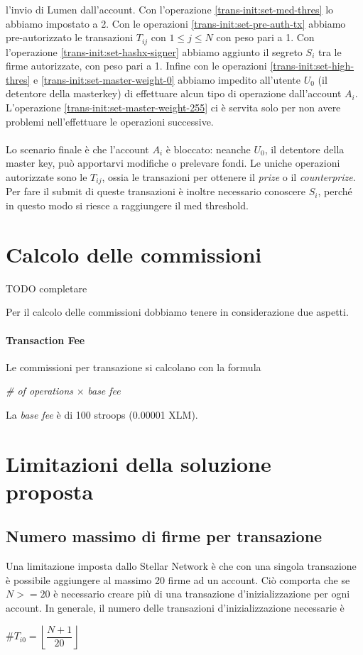 l'invio di Lumen dall'account.
Con l'operazione \ref{trans-init:set-med-thres} lo abbiamo impostato a 2.
Con le operazioni \ref{trans-init:set-pre-auth-tx} abbiamo pre-autorizzato
le transazioni
$ T_{ij} $ con $ 1 \leq j \leq N $ con peso pari a 1.
Con l'operazione \ref{trans-init:set-hashx-signer} abbiamo aggiunto il segreto
$ S_i $ tra le firme autorizzate, con peso pari a 1.
Infine con le operazioni \ref{trans-init:set-high-thres} e
\ref{trans-init:set-master-weight-0} abbiamo impedito all'utente $ U_0 $ (il
detentore della masterkey) di effettuare alcun tipo di operazione dall'account $ A_i $.
L'operazione \ref{trans-init:set-master-weight-255} ci è servita solo per
non avere problemi
nell'effettuare le operazioni successive.
\\
\\
Lo scenario finale è che l'account $ A_i $ è bloccato: neanche $ U_0 $, il detentore
della master key, può apportarvi modifiche o prelevare fondi. Le uniche operazioni
autorizzate sono le $ T_{ij} $, ossia le transazioni per ottenere il \textit{prize}
o il \textit{counterprize}. Per fare il submit di queste transazioni è inoltre
necessario conoscere $ S_i $, perché in questo modo si riesce a raggiungere
il med threshold.
\section{Calcolo delle commissioni}
\label{sec:calcolo-commissioni}
TODO completare


Per il calcolo delle commissioni dobbiamo tenere in considerazione due aspetti.
\paragraph{Transaction Fee} Le commissioni per transazione si calcolano con la formula
\begin{center}
	\textit{\# of operations} $ \times $ \textit{base fee}
\end{center}
La \textit{base fee} è di 100 stroops (0.00001 XLM).


\section{Limitazioni della soluzione proposta}

\subsection{Numero massimo di firme per transazione}
Una limitazione imposta dallo Stellar Network è che con
una singola transazione è possibile aggiungere al massimo 20 firme ad un account.
Ciò comporta che se $ N >= 20 $ è necessario creare più di una transazione
d'inizializzazione per ogni account.
In generale, il numero delle transazioni d'inizializzazione necessarie è
\begin{center}
	$ \# T_{i0} = \left\lfloor\dfrac{ N + 1 }{ 20 }\right\rfloor $
\end{center}

